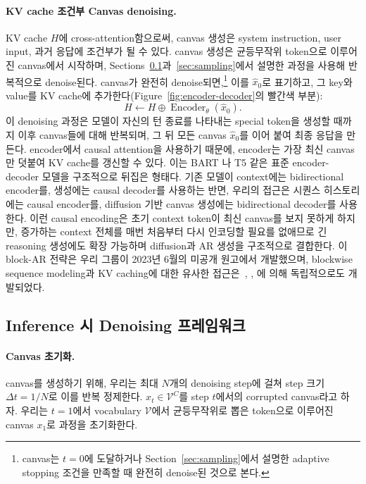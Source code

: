 \documentclass[11pt, a4paper, logo, copyright, gdm]{google}
\newcommand{\enc}{\operatorname{Encoder}_{\theta}}
\newcommand{\Vcal}{\mathcal{V}}
\begin{document}
\paragraph{KV cache 조건부 Canvas denoising.} KV cache $H$에 cross-attention함으로써, canvas 생성은 system instruction, user input, 과거 응답에 조건부가 될 수 있다. canvas 생성은 균등무작위 token으로 이루어진 canvas에서 시작하며, Sections~\ref{sec:denoising}과~\ref{sec:sampling}에서 설명한 과정을 사용해 반복적으로 denoise된다. canvas가 완전히 denoise되면,\footnote{canvas는 $t=0$에 도달하거나 Section~\ref{sec:sampling}에서 설명한 adaptive stopping 조건을 만족할 때 완전히 denoise된 것으로 본다.} 이를 $\hat{x}_0$로 표기하고, 그 key와 value를 KV cache에 추가한다(Figure~\ref{fig:encoder-decoder}의 빨간색 부분):
\begin{equation}
    \label{eq:updated_kv_cache}
    H \gets H \oplus \enc(\hat{x}_0).
\end{equation}
이 denoising 과정은 모델이 자신의 턴 종료를 나타내는 special token을 생성할 때까지 이후 canvas들에 대해 반복되며, 그 뒤 모든 canvas $\hat{x}_0$를 이어 붙여 최종 응답을 만든다. encoder에서 causal attention을 사용하기 때문에, encoder는 가장 최신 canvas만 덧붙여 KV cache를 갱신할 수 있다. 이는 BART \citep{lewis2020bart}나 T5 \citep{raffel2020exploring} 같은 표준 encoder-decoder 모델을 구조적으로 뒤집은 형태다. 기존 모델이 context에는 bidirectional encoder를, 생성에는 causal decoder를 사용하는 반면, 우리의 접근은 시퀀스 히스토리에는 causal encoder를, diffusion 기반 canvas 생성에는 bidirectional decoder를 사용한다. 이런 causal encoding은 초기 context token이 최신 canvas를 보지 못하게 하지만, 증가하는 context 전체를 매번 처음부터 다시 인코딩할 필요를 없애므로 긴 reasoning 생성에도 확장 가능하며 diffusion과 AR 생성을 구조적으로 결합한다. 이 block-AR 전략은 우리 그룹이 2023년 6월의 미공개 원고에서 개발했으며, blockwise sequence modeling과 KV caching에 대한 유사한 접근은~\citet{wu2025fastdllmv2}, \citet{arriola2025block}, \citet{deschenaux2026blockgen}에 의해 독립적으로도 개발되었다.


\subsection{Inference 시 Denoising 프레임워크}\label{sec:denoising}

\paragraph{Canvas 초기화.} canvas를 생성하기 위해, 우리는 최대 $N$개의 denoising step에 걸쳐 step 크기 $\Delta t = 1 / N$로 이를 반복 정제한다. $x_t \in \Vcal^C$를 step $t$에서의 corrupted canvas라고 하자. 우리는 $t=1$에서 vocabulary $\Vcal$에서 균등무작위로 뽑은 token으로 이루어진 canvas $x_1$로 과정을 초기화한다.
\end{document}
